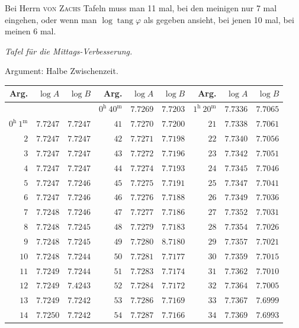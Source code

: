 Bei Herrn \textsc{von Zachs} Tafeln muss man 11 mal, bei den meinigen nur 7 mal eingehen, oder wenn man $\log\operatorname{tang}\varphi$ als gegeben ansieht, bei jenen 10 mal, bei meinen 6 mal.
\clearpage{}%
\begin{center}
\emph{Tafel für die Mittags-Verbesserung.}\par\medskip
Argument: Halbe Zwischenzeit.\par\medskip
\begingroup\fontsize{9}{10.2}\selectfont\setlength{\tabcolsep}{3pt}
\begin{tabular}{r|r|r||r|r|r||r|r|r}
Arg. & $\log A$ & $\log B$ & Arg. & $\log A$ & $\log B$ & Arg. & $\log A$ & $\log B$\\\hline
 &  &  & $0^{\mathrm h}\ 40^{\mathrm m}$ & $7.7269$ & $7.7203$ & $1^{\mathrm h}\ 20^{\mathrm m}$ & $7.7336$ & $7.7065$\\
$0^{\mathrm h}\ 1^{\mathrm m}$ & $7.7247$ & $7.7247$ & $41$ & $7.7270$ & $7.7200$ & $21$ & $7.7338$ & $7.7061$\\
$2$ & $7.7247$ & $7.7247$ & $42$ & $7.7271$ & $7.7198$ & $22$ & $7.7340$ & $7.7056$\\
$3$ & $7.7247$ & $7.7247$ & $43$ & $7.7272$ & $7.7196$ & $23$ & $7.7342$ & $7.7051$\\
$4$ & $7.7247$ & $7.7247$ & $44$ & $7.7274$ & $7.7193$ & $24$ & $7.7345$ & $7.7046$\\
$5$ & $7.7247$ & $7.7246$ & $45$ & $7.7275$ & $7.7191$ & $25$ & $7.7347$ & $7.7041$\\
$6$ & $7.7247$ & $7.7246$ & $46$ & $7.7276$ & $7.7188$ & $26$ & $7.7349$ & $7.7036$\\
$7$ & $7.7248$ & $7.7246$ & $47$ & $7.7277$ & $7.7186$ & $27$ & $7.7352$ & $7.7031$\\
$8$ & $7.7248$ & $7.7245$ & $48$ & $7.7279$ & $7.7183$ & $28$ & $7.7354$ & $7.7026$\\
$9$ & $7.7248$ & $7.7245$ & $49$ & $7.7280$ & $8.7180$ & $29$ & $7.7357$ & $7.7021$\\
$10$ & $7.7248$ & $7.7244$ & $50$ & $7.7281$ & $7.7177$ & $30$ & $7.7359$ & $7.7015$\\
$11$ & $7.7249$ & $7.7244$ & $51$ & $7.7283$ & $7.7174$ & $31$ & $7.7362$ & $7.7010$\\
$12$ & $7.7249$ & $7.4243$ & $52$ & $7.7284$ & $7.7172$ & $32$ & $7.7364$ & $7.7005$\\
$13$ & $7.7249$ & $7.7242$ & $53$ & $7.7286$ & $7.7169$ & $33$ & $7.7367$ & $7.6999$\\
$14$ & $7.7250$ & $7.7242$ & $54$ & $7.7287$ & $7.7166$ & $34$ & $7.7369$ & $7.6993$\\

\end{tabular}
\end{center}
